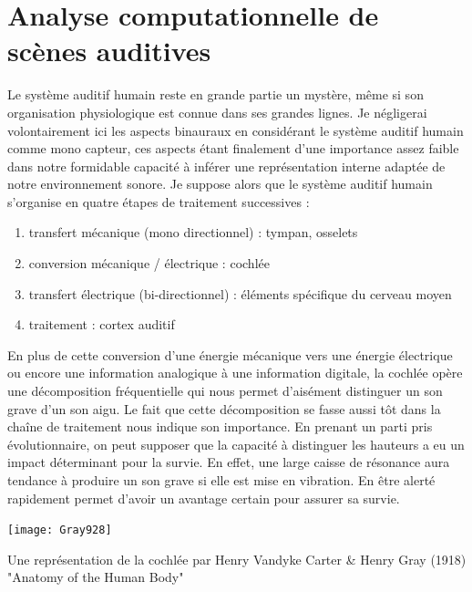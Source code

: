 
\section{\nmu Analyse computationnelle de scènes auditives} \label{sec:asa}

Le système auditif humain reste en grande partie un mystère, même si son organisation physiologique est connue dans ses grandes lignes. Je négligerai volontairement ici les aspects binauraux en considérant le système auditif humain comme mono capteur, ces aspects étant finalement d'une importance assez faible dans notre formidable capacité à inférer une représentation interne adaptée de notre environnement sonore. Je suppose alors que le système auditif humain s'organise en quatre étapes de traitement successives :
\begin{enumerate}
  \item transfert mécanique (mono directionnel) : tympan, osselets
  \item conversion mécanique / électrique : cochlée
  \item transfert électrique (bi-directionnel) : éléments spécifique du cerveau moyen
  \item traitement : cortex auditif
\end{enumerate}

En plus de cette conversion d'une énergie mécanique vers une énergie électrique ou encore une information analogique à une information digitale, la cochlée opère une décomposition fréquentielle qui nous permet d'aisément distinguer un son grave d'un son aigu. Le fait que cette décomposition se fasse aussi tôt dans la chaîne de traitement nous indique son importance. En prenant un parti pris évolutionnaire, on peut supposer que la capacité à distinguer les hauteurs a eu un impact déterminant pour la survie. En effet, une large caisse de résonance aura tendance à produire un son grave si elle est mise en vibration. En être alerté rapidement permet d'avoir un avantage certain pour assurer sa survie.

\begin{marginfigure}
  \texttt{[image: Gray928]}
  \caption{Une représentation de la cochlée par Henry Vandyke Carter \& Henry Gray (1918) "Anatomy of the Human Body"} %
\end{marginfigure}

